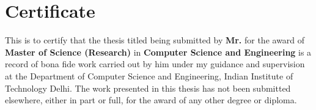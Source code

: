 
\chapter*{Certificate}

This is  to certify that  the thesis titled 
\textbf{\ThesisTitle{}}
being   submitted  by   \textbf{Mr. \Auth{}}  for   the  award   of
\textbf{Master of Science (Research)} in \textbf{Computer Science and Engineering} is
a record of bona fide work carried out by him under my guidance and
supervision at the Department of Computer Science and Engineering, Indian Institute of Technology Delhi.
The work presented in this thesis has not been submitted elsewhere, either in part or full, for the award of
any other degree or diploma.

\vspace {10 pc}


\begin{flushright}
\noindent{\Guide{}} \\
 \\
\\
 \\

\end{flushright}


